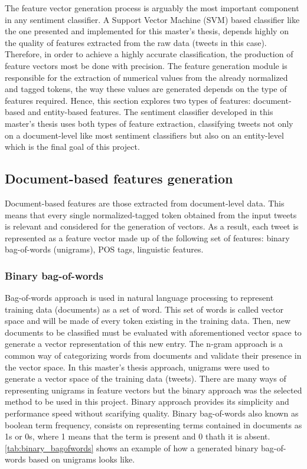 The feature vector generation process is arguably the most important component in any sentiment classifier. A Support Vector Machine (SVM) based classifier like the one presented and implemented for this master's thesis, depends highly on the quality of features extracted from the raw data (tweets in this case). Therefore, in order to achieve a highly accurate classification, the production of feature vectors most be done with precision. The feature generation module is responsible for the extraction of numerical values from the already normalized and tagged tokens, the way these values are generated depends on the type of features required. Hence, this section explores two types of features: document-based and entity-based features. The sentiment classifier developed in this master's thesis uses both types of feature extraction, classifying tweets not only on a document-level like most sentiment classifiers but also on an entity-level which is the final goal of this project.   

\subsection{Document-based features generation}

Document-based features are those extracted from document-level data. This means that every single normalized-tagged token obtained from the input tweets is relevant and considered for the generation of vectors. As a result, each tweet is represented as a feature vector made up of the following set of features: binary bag-of-words (unigrams), POS tags, linguistic features.

\subsubsection{Binary bag-of-words}

Bag-of-words approach is used in natural language processing to represent training data (documents) as a set of word. This set of words is called vector space and will be made of every token existing in the training data. Then, new documents to be classified must be evaluated with aforementioned vector space to generate a vector representation of this new entry. The n-gram approach is a common way of categorizing words from documents and validate their presence in the vector space. In this master's thesis approach, unigrams were used to generate a vector space of the training data (tweets). There are many ways of representing unigrams in feature vectors but the binary approach was the selected method to be used in this project. Binary approach provides its simplicity and performance speed without scarifying quality. Binary bag-of-words also known as boolean term frequency, consists on representing terms contained in documents as 1s or 0s, where 1 means that the term is present and 0 thath it is absent. \autoref{tab:binary_bagofwords} shows an example of how a generated binary bag-of-words based on unigrams looks like.

